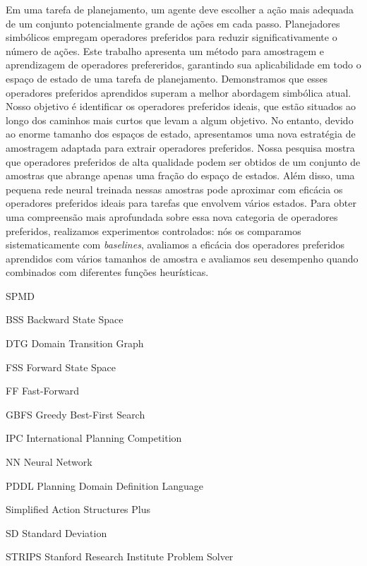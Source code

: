 \documentclass[ppgc,diss,english]{iiufrgs}
\begin{document}
\begin{translatedabstract}
Em uma tarefa de planejamento, um agente deve escolher a ação mais adequada de um conjunto potencialmente grande de ações em cada passo. Planejadores simbólicos empregam operadores preferidos para reduzir significativamente o número de ações. Este trabalho apresenta um método para amostragem e aprendizagem de operadores prefereridos, garantindo sua aplicabilidade em todo o espaço de estado de uma tarefa de planejamento. Demonstramos que esses operadores preferidos aprendidos superam a melhor abordagem simbólica atual.
Nosso objetivo é identificar os operadores preferidos ideais, que estão situados ao longo dos caminhos mais curtos que levam a algum objetivo. No entanto, devido ao enorme tamanho dos espaços de estado, apresentamos uma nova estratégia de amostragem adaptada para extrair operadores preferidos. Nossa pesquisa mostra que operadores preferidos de alta qualidade podem ser obtidos de um conjunto de amostras que abrange apenas uma fração do espaço de estados. Além disso, uma pequena rede neural treinada nessas amostras pode aproximar com eficácia os operadores preferidos ideais para tarefas que envolvem vários estados.
Para obter uma compreensão mais aprofundada sobre essa nova categoria de operadores preferidos, realizamos experimentos controlados: nós os comparamos sistematicamente com \textit{baselines}, avaliamos a eficácia dos operadores preferidos aprendidos com vários tamanhos de amostra e avaliamos seu desempenho quando combinados com diferentes funções heurísticas.
\end{translatedabstract}

\begin{listofabbrv}{SPMD}
        \item[BSS] Backward State Space
        \item[DTG] Domain Transition Graph
        \item[FSS] Forward State Space
        \item[FF] Fast-Forward
        \item[GBFS] Greedy Best-First Search
        \item[IPC] International Planning Competition
        \item[NN]  Neural Network
        \item[PDDL] Planning Domain Definition Language
        \item[\sas] Simplified Action Structures Plus
        \item[SD] Standard Deviation
        \item[STRIPS] Stanford Research Institute Problem Solver
\end{listofabbrv}
\end{document}
